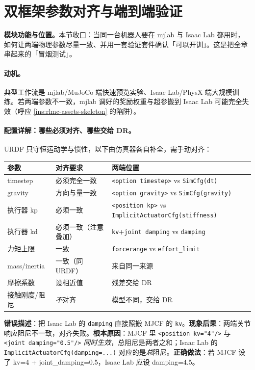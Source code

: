 \section{双框架参数对齐与端到端验证}
\label{sec:rlmc-assets-align}

\textbf{模块功能与位置。}本节收口：当同一台机器人要在 mjlab 与 Isaac Lab 都用时，如何让两端物理参数尽量一致、并用一套验证套件确认「可以开训」。这是把全章串起来的「冒烟测试」。

\paragraph{动机。}典型工作流是 mjlab/MuJoCo 端快速预览实验、Isaac Lab/PhysX 端大规模训练。若两端参数不一致，mjlab 调好的奖励权重与超参搬到 Isaac Lab 可能完全失效（呼应 \cref{ins:rlmc-assets-skeleton} 的陷阱）。

\paragraph{配置详解：哪些必须对齐、哪些交给 DR。}URDF 只守恒运动学与惯性，以下由仿真器各自补全，需手动对齐：

\begin{center}
\small
\begin{tabular}{@{}lll@{}}
\toprule
参数 & 对齐要求 & 两端位置 \\
\midrule
timestep & 必须完全一致 & \texttt{<option timestep>} vs \texttt{SimCfg(dt)} \\
gravity & 方向与量一致 & \texttt{<option gravity>} vs \texttt{SimCfg(gravity)} \\
执行器 kp & 必须一致 & \texttt{<position kp>} vs \texttt{ImplicitActuatorCfg(stiffness)} \\
执行器 kd & 必须一致（注意叠加） & \texttt{kv}+\texttt{joint damping} vs \texttt{damping} \\
力矩上限 & 一致 & \texttt{forcerange} vs \texttt{effort\_limit} \\
mass/inertia & 一致（同 URDF） & 来自同一来源 \\
摩擦系数 & 设相近值 & 残差交给 DR \\
接触刚度/阻尼 & \emph{不}对齐 & 模型不同，交给 DR \\
\bottomrule
\end{tabular}
\end{center}

\begin{pitfall}
\textbf{错误描述}：把 Isaac Lab 的 \texttt{damping} 直接照搬 MJCF 的 \texttt{kv}。\textbf{现象后果}：两端关节响应阻尼不一致，对齐失败。\textbf{根本原因}：MJCF 里 \texttt{<position kv="4"/\allowbreak >} 与 \texttt{<joint damping="0.5"/\allowbreak >} \emph{同时生效}，总阻尼是两者之和；Isaac Lab 的 \texttt{ImplicitActuatorCfg(damping=...)} 对应的是\emph{总}阻尼。\textbf{正确做法}：若 MJCF 设了 kv=4 + joint\_damping=0.5，Isaac Lab 应设 damping=4.5。
\end{pitfall}

